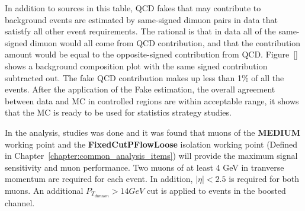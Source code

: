 In addition to sources in this table, QCD fakes that may contribute to background events are estimated by same-signed dimuon pairs in data that satistfy all other event requirements. The rational is that in data all of the same-signed dimuon would all come from QCD contribution, and that the contribution amount would be equal to the opposite-signed contribution from QCD. Figure~\ref{} shows a background composition plot with the same signed contribution subtracted out. The fake QCD contribution makes up less than 1\% of all the events. After the application of the Fake estimation, the overall agreement between data and MC in controlled regions are within acceptable range, it shows that the MC is ready to be used for statistics strategy studies.

In the analysis, studies was done and it was found that muons of the \textbf{MEDIUM} working point and the \textbf{FixedCutPFlowLoose} isolation working point (Defined in Chapter~\ref{chapter:common_analysis_items}) will provide the maximum signal sensitivity and muon performance. Two muons of at least 4 GeV in tranverse momentum are required for each event. In addition, $|\eta|< 2.5$ is required for both muons. An additional $P_{T}_{dimuon}> 14GeV$ cut is applied to events in the boosted channel.

